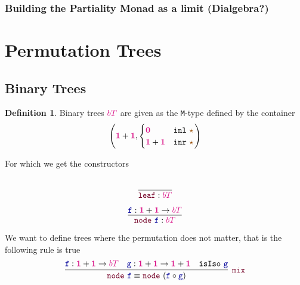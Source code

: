 \documentclass[twoside,11pt,openright]{report}
\theoremstyle{plain} %
\theoremstyle{definition}
\newtheorem{defn}[thm]{Definition}%
\theoremstyle{remark}
\newcommand*{\type}[1]{\textcolor{magenta!90!black}{#1}}
\newcommand*{\unit}{\type{\textbf{1}}}
\newcommand*{\empt}{\type{\textbf{0}}}
\newcommand*{\constant}[1]{\textcolor{orange!60!black}{\ensuremath{\mathtt{#1}}}}
\newcommand*{\function}[1]{\textcolor{blue!60!black}{\ensuremath{\mathtt{#1}}}}
\newcommand*{\constructor}[1]{\textcolor{purple!60!black}{\ensuremath{\mathtt{#1}}}}
\newcommand*{\unitelem}{\constant{\star}} %
\begin{document}
\subsubsection{Building the Partiality Monad as a limit (Dialgebra?)}

\section{Permutation Trees}
\subsection{Binary Trees}
\begin{defn}
  Binary trees \(\type{bT}\) are given as the \texttt{M}-type defined by the container
  \begin{equation}
    \left(\unit+\unit, \begin{cases} \empt & \mathtt{inl}~\unitelem\\ \unit + \unit & \mathtt{inr}~\unitelem \end{cases}\right)
  \end{equation}
\end{defn}
\noindent For which we get the constructors\\[-10mm]
\begin{center}
  \strut
  \hfill
  \begin{minipage}{0.20\linewidth}
    \begin{equation}
      \vcenter{\infer{\constructor{leaf} : \type{bT}}{\strut}}
    \end{equation}
  \end{minipage}
  \hfill
  \begin{minipage}{0.25\linewidth}
    \begin{equation}
      \vcenter{\infer{\constructor{node}~\function{f} : \type{bT}}{\function{f} : \unit + \unit \rightarrow \type{bT}}}
    \end{equation}
  \end{minipage}
  \hfill
  \strut
\end{center}
We want to define trees where the permutation does not matter, that is the following rule is true
\begin{equation}
  \vcenter{\infer[\constructor{mix}]{\constructor{node}~\function{f} \equiv \constructor{node}~(\function{f} \circ \function{g})}{\function{f} : \unit + \unit \rightarrow \type{bT} & \function{g} : \unit + \unit \rightarrow \unit + \unit & \mathtt{isIso}~\function{g}}}
\end{equation}
\end{document}
